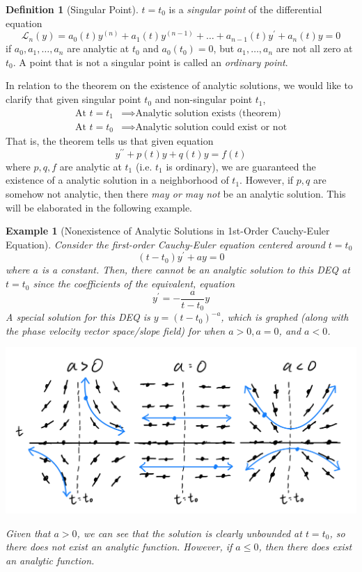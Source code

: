 \documentclass{article}
\newtheorem{example}{Example}[section]
\theoremstyle{remark}
\theoremstyle{definition}
\newtheorem{definition}{Definition}[section]
\begin{document}
\begin{definition}[Singular Point]
$t = t_0$ is a \textit{singular point} of the differential equation
\[\mathcal{L}_n (y) = a_0 (t) y^{(n)} + a_1 (t) y^{(n-1)} + \ldots + a_{n-1} (t) y^\prime + a_n (t) y = 0\]
if $a_0, a_1, \ldots, a_n$ are analytic at $t_0$ and $a_0 (t_0) = 0$, but $a_1, \ldots, a_n$ are not all zero at $t_0$. A point that is not a singular point is called an \textit{ordinary point}. 
\end{definition}

In relation to the theorem on the existence of analytic solutions, we would like to clarify that given singular point $t_0$ and non-singular point $t_1$, 
\begin{align*}
    \text{At } t = t_1 & \implies \text{Analytic solution exists (theorem)} \\
    \text{At } t = t_0 & \implies \text{Analytic solution could exist or not} 
\end{align*}
That is, the theorem tells us that given equation
\[y^{\prime\prime} + p(t) y + q(t) y = f(t)\]
where $p, q, f$ are analytic at $t_1$ (i.e. $t_1$ is ordinary), we are guaranteed the existence of a analytic solution in a neighborhood of $t_1$. However, if $p, q$ are somehow not analytic, then there \textit{may or may not} be an analytic solution. This will be elaborated in the following example. 

\begin{example}[Nonexistence of Analytic Solutions in 1st-Order Cauchy-Euler Equation]
Consider the first-order Cauchy-Euler equation centered around $t = t_0$
\[(t - t_0) y^\prime + a y = 0\]
where $a$ is a constant. Then, there cannot be an analytic solution to this DEQ at $t = t_0$ since the coefficients of the equivalent, equation
\[y^\prime = -\frac{a}{t-t_0} y\]
A special solution for this DEQ is $y = (t - t_0)^{-a}$, which is graphed (along with the phase velocity vector space/slope field) for when $a > 0, a = 0$, and $a < 0$. 
\begin{center}
    \includegraphics[scale=0.25]{img/Singular_Point_of_1st_Cauchy_Euler.PNG}
\end{center}
Given that $a > 0$, we can see that the solution is clearly unbounded at $t = t_0$, so there does not exist an analytic function. However, if $a \leq 0$, then there does exist an analytic function. 
\end{example}
\end{document}
